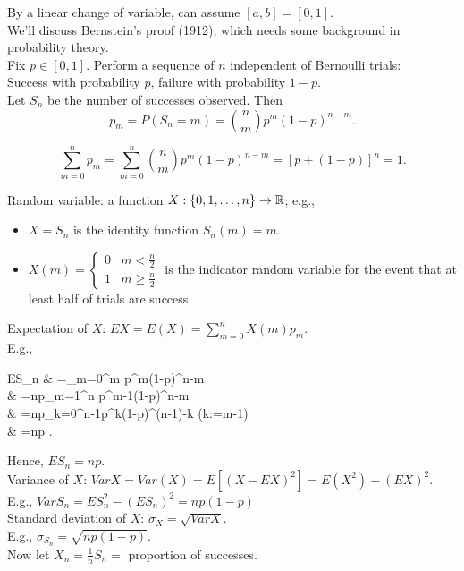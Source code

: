 \begin{exercise}
	By a linear change of variable, can assume $[a,b]=[0,1]$.\\
	We'll discuss Bernstein's proof (1912), which needs some background in probability theory.\\
	Fix $p \in [0,1]$. Perform a sequence of $n$ independent of Bernoulli trials:\\
	Success with probability $p$, failure with probability $1-p$.\\
	Let $S_{n}$ be the number of successes observed. Then
	\[
		p_{m}=P(S_{n}=m)= \binom{n}{m} p^{m}(1-p)^{n-m}
		.\]
	\begin{note}
		\[
			\sum_{m=0}^{n}{p_{m}}=\sum_{m=0}^{n}{\binom{n}{m}p^{m}(1-p)^{n-m}}=[p+(1-p)]^{n}=1
			.\]
	\end{note}
	Random variable: a function $X: \{0,1,\ldots ,n\}\to \mathbb{R}$; e.g.,
	\begin{itemize}
		\item $X=S_{n}$ is the identity function $S_{n}(m)=m$. \\
		\item $X(m)= \begin{cases}
				      0 & m<\frac{n}{2}    \\
				      1 & m\ge \frac{n}{2}
			      \end{cases}$ is the indicator random variable for the event that at least half of trials are success.
	\end{itemize}
	Expectation of $X$: $EX=E(X)=\sum_{m=0}^{n}{X(m)p_{m}}$.\\
	E.g.,
	\begin{flalign*}
		ES_n & =\sum_{m=0}^{\infty}{m p^{m}(1-p)^{n-m}}                            \\
		     & =np\sum_{m=1}^{n}{ p^{m-1}(1-p)^{n-m}}               \\
		     & =np\sum_{k=0}^{n-1}{p^{k}(1-p)^{(n-1)-k}}           \;\; (k:=m-1) \\
		     & =np
		.\end{flalign*}
	Hence, $ES_n=np$.\\
	Variance of $X$: $VarX=Var(X)=E[(X-EX)^2]=E(X^{2})-(EX)^{2}$.\\
	E.g., $VarS_n=E{S_n^{2}}-(ES_n)^{2}=np(1-p)$\\
	Standard deviation of $X$: $\sigma_{X}=\sqrt{VarX}$.\\
	E.g., $\sigma_{S_n}=\sqrt{np(1-p)}$.\\
	Now let $X_{n}=\frac{1}{n}S_n=$ proportion of successes.\\

\end{exercise}
